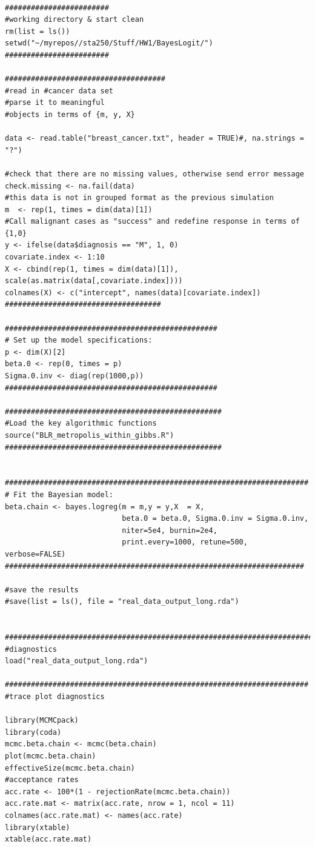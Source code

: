 \documentclass[11pt]{amsart}
\begin{document}
\begin{verbatim}

########################
#working directory & start clean
rm(list = ls())
setwd("~/myrepos//sta250/Stuff/HW1/BayesLogit/")
########################

#####################################
#read in #cancer data set
#parse it to meaningful
#objects in terms of {m, y, X}

data <- read.table("breast_cancer.txt", header = TRUE)#, na.strings = "?")

#check that there are no missing values, otherwise send error message
check.missing <- na.fail(data)
#this data is not in grouped format as the previous simulation
m  <- rep(1, times = dim(data)[1])
#Call malignant cases as "success" and redefine response in terms of {1,0}
y <- ifelse(data$diagnosis == "M", 1, 0)
covariate.index <- 1:10
X <- cbind(rep(1, times = dim(data)[1]), scale(as.matrix(data[,covariate.index])))
colnames(X) <- c("intercept", names(data)[covariate.index])
####################################

#################################################
# Set up the model specifications:
p <- dim(X)[2]
beta.0 <- rep(0, times = p)
Sigma.0.inv <- diag(rep(1000,p))
#################################################

##################################################
#Load the key algorithmic functions
source("BLR_metropolis_within_gibbs.R")
##################################################


######################################################################
# Fit the Bayesian model:
beta.chain <- bayes.logreg(m = m,y = y,X  = X,
                           beta.0 = beta.0, Sigma.0.inv = Sigma.0.inv,
                           niter=5e4, burnin=2e4,
                           print.every=1000, retune=500, verbose=FALSE)
#####################################################################

#save the results
#save(list = ls(), file = "real_data_output_long.rda")


#########################################################################
#diagnostics
load("real_data_output_long.rda")

######################################################################
#trace plot diagnostics

library(MCMCpack)
library(coda)
mcmc.beta.chain <- mcmc(beta.chain)
plot(mcmc.beta.chain)
effectiveSize(mcmc.beta.chain)
#acceptance rates
acc.rate <- 100*(1 - rejectionRate(mcmc.beta.chain))
acc.rate.mat <- matrix(acc.rate, nrow = 1, ncol = 11)
colnames(acc.rate.mat) <- names(acc.rate)
library(xtable)
xtable(acc.rate.mat)


\end{verbatim}
\end{document}
